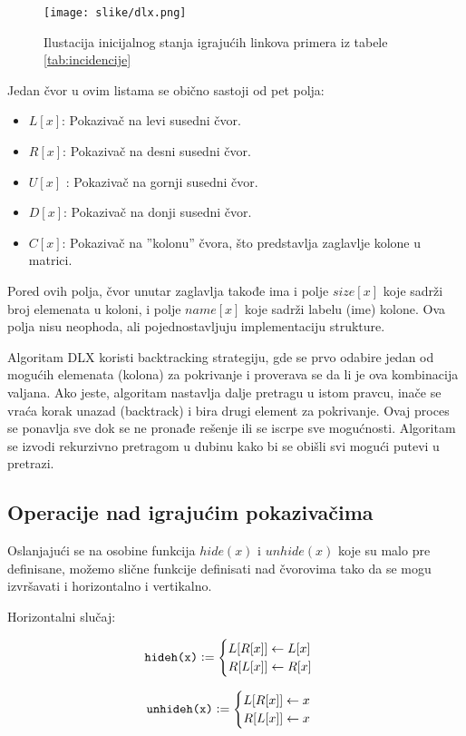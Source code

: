 \documentclass[a4paper]{article}
\begin{document}
{\begin{figure}[h!]
  \begin{center}
  \texttt{[image: slike/dlx.png]}
  \end{center}
  \caption{Ilustacija inicijalnog stanja igrajućih linkova primera iz tabele \ref{tab:incidencije}}
  \label{fig:dlx}
\end{figure}

Jedan čvor u ovim listama se obično sastoji od pet polja:
\begin{itemize}
  \item \( L[x] \): Pokazivač na levi susedni čvor.
  \item \( R[x] \): Pokazivač na desni susedni čvor.
  \item \( U[x] \) : Pokazivač na gornji susedni čvor.
  \item \( D[x] \): Pokazivač na donji susedni čvor.
  \item \( C[x] \): Pokazivač na ''kolonu'' čvora, što predstavlja zaglavlje kolone u matrici.
\end{itemize}

Pored ovih polja, čvor unutar zaglavlja takođe ima i polje \( size[x] \) koje sadrži broj elemenata u
koloni, i polje \( name[x] \) koje sadrži labelu (ime) kolone. Ova polja nisu neophoda, ali pojednostavljuju
implementaciju strukture.

Algoritam DLX koristi backtracking strategiju, gde se prvo odabire jedan od mogućih elemenata (kolona) za
pokrivanje i proverava se da li je ova kombinacija valjana. Ako jeste, algoritam nastavlja dalje pretragu
u istom pravcu, inače se vraća korak unazad (backtrack) i bira drugi element za pokrivanje. Ovaj proces se
ponavlja sve dok se ne pronađe rešenje ili se iscrpe sve mogućnosti. Algoritam se izvodi rekurzivno
pretragom u dubinu kako bi se obišli svi mogući putevi u pretrazi.

\subsection{Operacije nad igrajućim pokazivačima}

Oslanjajući se na osobine funkcija  \( hide(x) \) i \( unhide(x) \) koje su malo pre definisane,
možemo slične funkcije definisati nad čvorovima tako da se mogu izvršavati i horizontalno i vertikalno.

Horizontalni slučaj:\\
\begin{minipage}{0.45\textwidth}
  \[
  \texttt{hideh(x)} \vcentcolon =
  \begin{cases}
    L[R[x]] \gets L[x] \\
    R[L[x]] \gets R[x]
  \end{cases}
  \]
\end{minipage}
\begin{minipage}{0.45\textwidth}
  \[
  \texttt{unhideh(x)} \vcentcolon =
  \begin{cases}
    L[R[x]] \gets x \\
    R[L[x]] \gets x
  \end{cases}
  \]
\end{minipage}\\

}
\end{document}
